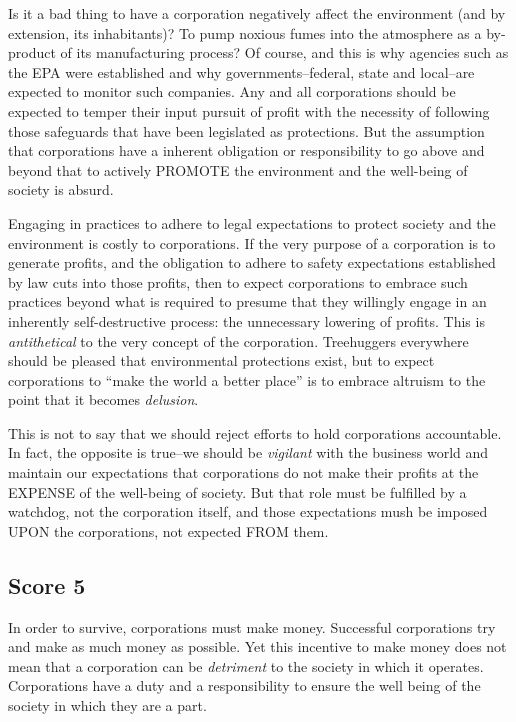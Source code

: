 Is it a bad thing to have a corporation negatively affect the environment (and by extension, its inhabitants)?
To pump noxious fumes into the atmosphere as a by-product of its manufacturing process?
Of course, and this is why agencies such as the EPA were established and why governments--federal, state and local--are expected to monitor such companies.
Any and all corporations should be expected to temper their input pursuit of profit with the necessity of following those safeguards that have been legislated as protections.
But the assumption that corporations have a inherent obligation or responsibility to go above and beyond that to actively PROMOTE the environment and the well-being of society is absurd.

Engaging in practices to adhere to legal expectations to protect society and the environment is costly to corporations.
If the very purpose of a corporation is to generate profits, and the obligation to adhere to safety expectations established by law cuts into those profits, then to expect corporations to embrace such practices beyond what is required to presume that they willingly engage in an inherently self-destructive process: the unnecessary lowering of profits.
This is \emph{antithetical} to the very concept of the corporation.
Treehuggers everywhere should be pleased that environmental protections exist, but to expect corporations to ``make the world a better place'' is to embrace altruism to the point that it becomes \emph{delusion}.

This is not to say that we should reject efforts to hold corporations accountable.
In fact, the opposite is true--we should be \emph{vigilant} with the business world and maintain our expectations that corporations do not make their profits at the EXPENSE of the well-being of society.
But that role must be fulfilled by a watchdog, not the corporation itself, and those expectations mush be imposed UPON the corporations, not expected FROM them.

\subsection{Score 5}
In order to survive, corporations must make money.
Successful corporations try and make as much money as possible.
Yet this incentive to make money does not mean that a corporation can be \emph{detriment} to the society in which it operates.
Corporations have a duty and a responsibility to ensure the well being of the society in which they are a part.

